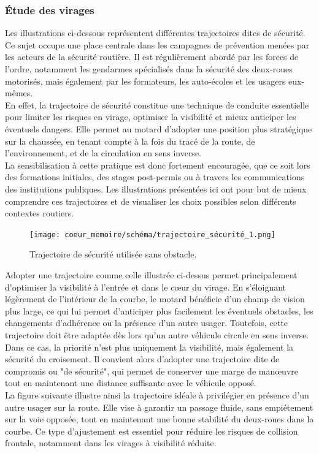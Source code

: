\subsubsection{Étude des virages}
Les illustrations ci-dessous représentent différentes trajectoires dites de sécurité. Ce sujet occupe une place centrale dans les campagnes de prévention menées par les acteurs de la sécurité routière. Il est régulièrement abordé par les forces de l’ordre, notamment les gendarmes spécialisés dans la sécurité des deux-roues motorisés, mais également par les formateurs, les auto-écoles et les usagers eux-mêmes.\\
En effet, la trajectoire de sécurité constitue une technique de conduite essentielle pour limiter les risques en virage, optimiser la visibilité et mieux anticiper les éventuels dangers. Elle permet au motard d’adopter une position plus stratégique sur la chaussée, en tenant compte à la fois du tracé de la route, de l’environnement, et de la circulation en sens inverse.\\
La sensibilisation à cette pratique est donc fortement encouragée, que ce soit lors des formations initiales, des stages post-permis ou à travers les communications des institutions publiques. Les illustrations présentées ici ont pour but de mieux comprendre ces trajectoires et de visualiser les choix possibles selon différents contextes routiers.
\begin{figure}[H]
    \centering
    \texttt{[image: coeur\_memoire/schéma/trajectoire\_sécurité\_1.png]} 
    \caption{Trajectoire de sécurité utilisée sans obstacle.}
\end{figure}
Adopter une trajectoire comme celle illustrée ci-dessus permet principalement d’optimiser la visibilité à l’entrée et dans le cœur du virage. En s’éloignant légèrement de l’intérieur de la courbe, le motard bénéficie d’un champ de vision plus large, ce qui lui permet d’anticiper plus facilement les éventuels obstacles, les changements d’adhérence ou la présence d’un autre usager.
Toutefois, cette trajectoire doit être adaptée dès lors qu’un autre véhicule circule en sens inverse. Dans ce cas, la priorité n’est plus uniquement la visibilité, mais également la sécurité du croisement. Il convient alors d’adopter une trajectoire dite de compromis ou "de sécurité", qui permet de conserver une marge de manœuvre tout en maintenant une distance suffisante avec le véhicule opposé.\\
La figure suivante illustre ainsi la trajectoire idéale à privilégier en présence d’un autre usager sur la route. Elle vise à garantir un passage fluide, sans empiétement sur la voie opposée, tout en maintenant une bonne stabilité du deux-roues dans la courbe. Ce type d’ajustement est essentiel pour réduire les risques de collision frontale, notamment dans les virages à visibilité réduite.
